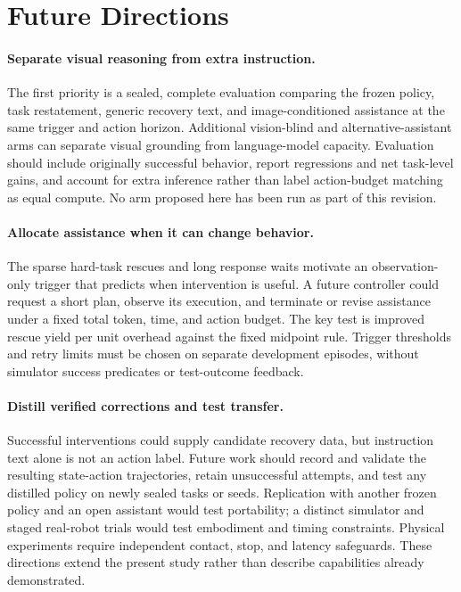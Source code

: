 \documentclass[10pt,twocolumn,letterpaper]{article}
\begin{document}
\section{Future Directions}
\label{sec:future}
\paragraph{Separate visual reasoning from extra instruction.}
The first priority is a sealed, complete evaluation comparing the frozen policy, task restatement, generic recovery text, and image-conditioned assistance at the same trigger and action horizon. Additional vision-blind and alternative-assistant arms can separate visual grounding from language-model capacity. Evaluation should include originally successful behavior, report regressions and net task-level gains, and account for extra inference rather than label action-budget matching as equal compute. No arm proposed here has been run as part of this revision.

\paragraph{Allocate assistance when it can change behavior.}
The sparse hard-task rescues and long response waits motivate an observation-only trigger that predicts when intervention is useful. A future controller could request a short plan, observe its execution, and terminate or revise assistance under a fixed total token, time, and action budget. The key test is improved rescue yield per unit overhead against the fixed midpoint rule. Trigger thresholds and retry limits must be chosen on separate development episodes, without simulator success predicates or test-outcome feedback.

\paragraph{Distill verified corrections and test transfer.}
Successful interventions could supply candidate recovery data, but instruction text alone is not an action label. Future work should record and validate the resulting state-action trajectories, retain unsuccessful attempts, and test any distilled policy on newly sealed tasks or seeds. Replication with another frozen policy and an open assistant would test portability; a distinct simulator and staged real-robot trials would test embodiment and timing constraints. Physical experiments require independent contact, stop, and latency safeguards. These directions extend the present study rather than describe capabilities already demonstrated.
\end{document}
